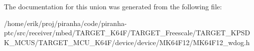 The documentation for this union was generated from the following file\+:\begin{DoxyCompactItemize}
\item 
/home/erik/proj/piranha/code/piranha-\/ptc/src/receiver/mbed/\+T\+A\+R\+G\+E\+T\+\_\+\+K64\+F/\+T\+A\+R\+G\+E\+T\+\_\+\+Freescale/\+T\+A\+R\+G\+E\+T\+\_\+\+K\+P\+S\+D\+K\+\_\+\+M\+C\+U\+S/\+T\+A\+R\+G\+E\+T\+\_\+\+M\+C\+U\+\_\+\+K64\+F/device/device/\+M\+K64\+F12/M\+K64\+F12\+\_\+wdog.\+h\end{DoxyCompactItemize}
